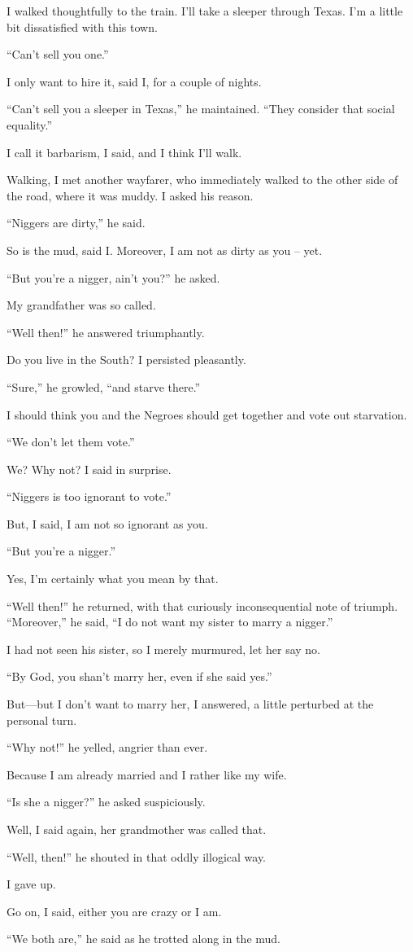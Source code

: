 \documentclass[10pt,a4paper]{article}
\begin{document}
I walked thoughtfully to the train. I’ll take a sleeper through Texas. I’m a little bit dissatisfied with this town.

“Can’t sell you one.”

I only want to hire it, said I, for a couple of nights.

“Can’t sell you a sleeper in Texas,” he maintained. “They consider that social equality.”

I call it barbarism, I said, and I think I’ll walk.

Walking, I met another wayfarer, who immediately walked to the other side of the road, where it was muddy. I asked his reason.

“Niggers are dirty,” he said.

So is the mud, said I. Moreover, I am not as dirty as you -- yet.

“But you’re a nigger, ain’t you?” he asked.

My grandfather was so called.

“Well then!” he answered triumphantly.

Do you live in the South? I persisted pleasantly.

“Sure,” he growled, “and starve there.”

I should think you and the Negroes should get together and vote out starvation.

“We don’t let them vote.”

We? Why not? I said in surprise.

“Niggers is too ignorant to vote.”

But, I said, I am not so ignorant as you.

“But you’re a nigger.”

Yes, I’m certainly what you mean by that.

“Well then!” he returned, with that curiously inconsequential note of triumph. “Moreover,” he said, “I do not want my sister to marry a nigger.”

I had not seen his sister, so I merely murmured, let her say no.

“By God, you shan’t marry her, even if she said yes.”

But—but I don’t want to marry her, I answered, a little perturbed at the personal turn.

“Why not!” he yelled, angrier than ever.

Because I am already married and I rather like my wife.

“Is she a nigger?” he asked suspiciously.

Well, I said again, her grandmother was called that.

“Well, then!” he shouted in that oddly illogical way.

I gave up.

Go on, I said, either you are crazy or I am.

“We both are,” he said as he trotted along in the mud.
\end{document}
